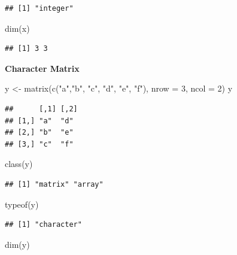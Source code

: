 \documentclass[
]{book}
\newenvironment{Shaded}{\begin{snugshade}}{\end{snugshade}}
\newcommand{\AttributeTok}[1]{\textcolor[rgb]{0.77,0.63,0.00}{#1}}
\newcommand{\DecValTok}[1]{\textcolor[rgb]{0.00,0.00,0.81}{#1}}
\newcommand{\FunctionTok}[1]{\textcolor[rgb]{0.00,0.00,0.00}{#1}}
\newcommand{\NormalTok}[1]{#1}
\newcommand{\OtherTok}[1]{\textcolor[rgb]{0.56,0.35,0.01}{#1}}
\newcommand{\StringTok}[1]{\textcolor[rgb]{0.31,0.60,0.02}{#1}}
\begin{document}
\begin{verbatim}
## [1] "integer"
\end{verbatim}

\begin{Shaded}
\begin{Highlighting}[]
\FunctionTok{dim}\NormalTok{(x)}
\end{Highlighting}
\end{Shaded}

\begin{verbatim}
## [1] 3 3
\end{verbatim}

\textbf{Character Matrix}

\begin{Shaded}
\begin{Highlighting}[]
\NormalTok{y }\OtherTok{\textless{}{-}} \FunctionTok{matrix}\NormalTok{(}\FunctionTok{c}\NormalTok{(}\StringTok{"a"}\NormalTok{,}\StringTok{"b"}\NormalTok{, }\StringTok{"c"}\NormalTok{, }\StringTok{"d"}\NormalTok{, }\StringTok{"e"}\NormalTok{, }\StringTok{"f"}\NormalTok{), }\AttributeTok{nrow =} \DecValTok{3}\NormalTok{, }\AttributeTok{ncol =} \DecValTok{2}\NormalTok{)}
\NormalTok{y}
\end{Highlighting}
\end{Shaded}

\begin{verbatim}
##      [,1] [,2]
## [1,] "a"  "d" 
## [2,] "b"  "e" 
## [3,] "c"  "f"
\end{verbatim}

\begin{Shaded}
\begin{Highlighting}[]
\FunctionTok{class}\NormalTok{(y)}
\end{Highlighting}
\end{Shaded}

\begin{verbatim}
## [1] "matrix" "array"
\end{verbatim}

\begin{Shaded}
\begin{Highlighting}[]
\FunctionTok{typeof}\NormalTok{(y)}
\end{Highlighting}
\end{Shaded}

\begin{verbatim}
## [1] "character"
\end{verbatim}

\begin{Shaded}
\begin{Highlighting}[]
\FunctionTok{dim}\NormalTok{(y)}
\end{Highlighting}
\end{Shaded}
\end{document}
